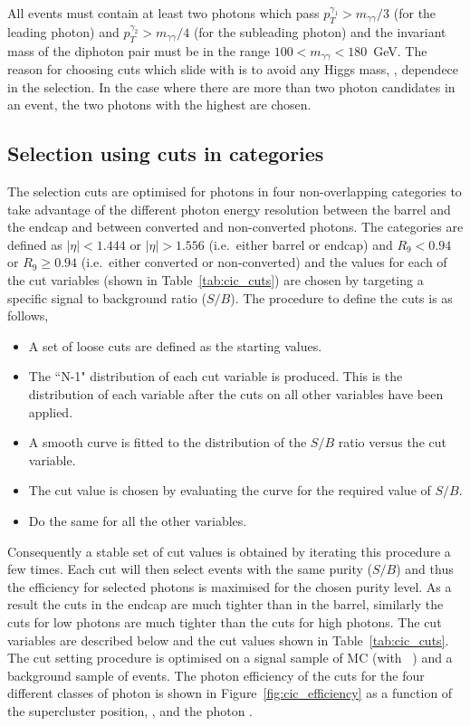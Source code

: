 All events must contain at least two photons which pass $p_{T}^{\gamma_{1}}>m_{\gamma\gamma}/3$ (for the leading photon) and $p_{T}^{\gamma_{2}}>m_{\gamma\gamma}/4$ (for the subleading photon) and the invariant mass of the diphoton pair must be in the range $100<m_{\gamma\gamma}<180$~GeV. The reason for choosing \pT cuts which slide with \mgg is to avoid any Higgs mass, \mH, dependece in the selection. In the case where there are more than two photon candidates in an event, the two photons with the highest \pT are chosen. 

\subsection{Selection using cuts in categories}
\label{sec:cic}

The selection cuts are optimised for photons in four non-overlapping categories to take advantage of the different photon energy resolution between the barrel and the endcap and between converted and non-converted photons. The categories are defined as $|\eta|<1.444$ or $|\eta|>1.556$ (i.e.\ either barrel or endcap) and $R_{9}<0.94$ or $R_{9}\geq 0.94$ (i.e.\ either converted or non-converted) and the values for each of the cut variables (shown in Table~\ref{tab:cic_cuts}) are chosen by targeting a specific signal to background ratio ($S/B$). The procedure to define the cuts is as follows,

\begin{itemize}
  \item A set of loose cuts are defined as the starting values.
  \item The ``N-1" distribution of each cut variable is produced. This is the distribution of each variable after the cuts on all other variables have been applied.
  \item A smooth curve is fitted to the distribution of the $S/B$ ratio versus the cut variable.
  \item The cut value is chosen by evaluating the curve for the required value of $S/B$.
  \item Do the same for all the other variables.
\end{itemize}

Consequently a stable set of cut values is obtained by iterating this procedure a few times. Each cut will then select events with the same purity ($S/B$) and thus the efficiency for selected photons is maximised for the chosen purity level. As a result the cuts in the endcap are much tighter than in the barrel, similarly the cuts for low \rnine photons are much tighter than the cuts for high \rnine photons. The cut variables are described below and the cut values shown in Table~\ref{tab:cic_cuts}. The cut setting procedure is optimised on a signal sample of \Hgg MC (with ~\GeV) and a background sample of \gjet events. The photon efficiency of the cuts for the four different classes of photon is shown in Figure~\ref{fig:cic_efficiency} as a function of the supercluster position, \eta, and the photon \pT.


